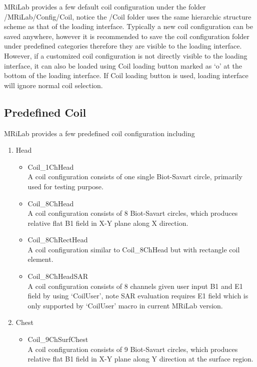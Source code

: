 \documentclass{book}%
\begin{document}
MRiLab provides a few default coil configuration under the folder /MRiLab/Config/Coil, notice the /Coil folder uses the same hierarchic structure scheme as that of the loading interface. Typically a new coil configuration can be saved anywhere, however it is recommended to save the coil configuration folder under predefined categories therefore they are visible to the loading interface. However, if a customized coil configuration is not directly visible to the loading interface, it can also be loaded using Coil loading button marked as `o' at the bottom of the loading interface. If Coil loading button is used, loading interface will ignore normal coil selection.

\subsection{Predefined Coil}

MRiLab provides a few predefined coil configuration including

\begin{enumerate}
		\item Head
		\begin{itemize}
			\item Coil\_1ChHead \\
			A coil configuration consists of one single Biot-Savart circle, primarily used for testing purpose.
			\item Coil\_8ChHead \\
			A coil configuration consists of 8 Biot-Savart circles, which produces relative flat B1 field in X-Y plane along X direction.
			\item Coil\_8ChRectHead \\
			A coil configuration similar to Coil\_8ChHead but with rectangle coil element.
			\item Coil\_8ChHeadSAR \\
			A coil configuration consists of 8 channels given user input B1 and E1 field by using `CoilUser', note SAR evaluation requires E1 field which is only supported by `CoilUser' macro in current MRiLab version.
		\end{itemize}
		
		\item Chest
		\begin{itemize}
			\item Coil\_9ChSurfChest \\
			A coil configuration consists of 9 Biot-Savart circles, which produces relative flat B1 field in X-Y plane along Y direction at the surface region.
		\end{itemize}
\end{enumerate}
\end{document}
